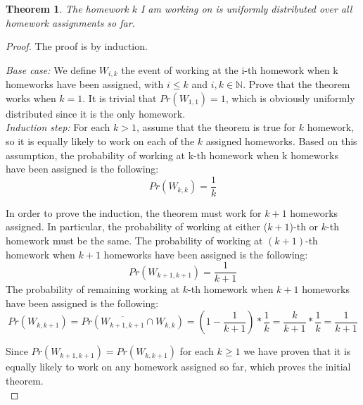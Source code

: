 \documentclass[11pt]{537homework}
\newtheorem{theorem}{Theorem}
\begin{document}
{{{\begin{theorem}
 The homework $k$ I am working on is uniformly distributed over all homework assignments so far.
\end{theorem}
\begin{proof} The proof is by induction.

\noindent\textsl{Base case:} We define $W_{i,k}$ the event of working at the i-th homework when k homeworks have been assigned, with $i \leq k$ and $ i,k \in \mathbb{N}$. Prove that the theorem works when $k=1$. It is trivial that $Pr{(W_{1,1})}=1$, which is obviously uniformly distributed since it is the only homework.\\[0.25cm] 


\noindent\textsl{Induction step:} For each $k > 1$, assume that the theorem is true for $k$ homework, so it is equally likely to work on each of the $k$ assigned homeworks. Based on this assumption, the probability of working at k-th homework when k homeworks have been assigned is the following:
\begin{equation}
  Pr{(W_{k,k})} = \frac{1}{k}
\end{equation}

In order to prove the induction, the theorem must work for $k+1$ homeworks assigned. In particular, the probability of working at either ($k+1$)-th or $k$-th homework must be the same. The probability of working at $(k+1)$-th homework when $k+1$ homeworks have been assigned is the following: 
\begin{equation}
  Pr{(W_{k+1,k+1})} = \frac{1}{k+1}
\end{equation}
The probability of remaining working at $k$-th homework when $k+1$ homeworks have been assigned is the following: 
\begin{equation*}
  Pr{(W_{k,k+1})} = Pr( \overline{W_{k+1,k+1}} \cap W_{k,k} ) = (1-\frac{1}{k+1})*\frac{1}{k}=\frac{k}{k+1}*\frac{1}{k}= \frac{1}{k+1}
\end{equation*}


Since $Pr{(W_{k+1,k+1})} = Pr{(W_{k,k+1})}$ for each $k\geq 1$ we have proven that it is equally likely to work on any homework assigned so far, which proves the initial theorem.\\[1cm]
\end{proof}









\subsection{}

}}}
\end{document}
